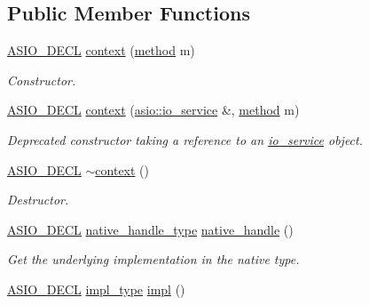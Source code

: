 \subsection*{Public Member Functions}
\begin{DoxyCompactItemize}
\item 
\hyperlink{config_8hpp_ab54d01ea04afeb9a8b39cfac467656b7}{A\+S\+I\+O\+\_\+\+D\+E\+C\+L} \hyperlink{classasio_1_1ssl_1_1context_ab6c186034550fa1b4991832cc7e5dc2b}{context} (\hyperlink{classasio_1_1ssl_1_1context__base_ac37d498266e3b13607f011ace6417525}{method} m)
\begin{DoxyCompactList}\small\item\em Constructor. \end{DoxyCompactList}\item 
\hyperlink{config_8hpp_ab54d01ea04afeb9a8b39cfac467656b7}{A\+S\+I\+O\+\_\+\+D\+E\+C\+L} \hyperlink{classasio_1_1ssl_1_1context_a0ca5760e47214ff3be8ceb41dbc420a1}{context} (\hyperlink{classasio_1_1io__service}{asio\+::io\+\_\+service} \&, \hyperlink{classasio_1_1ssl_1_1context__base_ac37d498266e3b13607f011ace6417525}{method} m)
\begin{DoxyCompactList}\small\item\em Deprecated constructor taking a reference to an \hyperlink{classasio_1_1io__service}{io\+\_\+service} object. \end{DoxyCompactList}\item 
\hyperlink{config_8hpp_ab54d01ea04afeb9a8b39cfac467656b7}{A\+S\+I\+O\+\_\+\+D\+E\+C\+L} \hyperlink{classasio_1_1ssl_1_1context_aa28787ca1050d36fdd98295c8453d554}{$\sim$context} ()
\begin{DoxyCompactList}\small\item\em Destructor. \end{DoxyCompactList}\item 
\hyperlink{config_8hpp_ab54d01ea04afeb9a8b39cfac467656b7}{A\+S\+I\+O\+\_\+\+D\+E\+C\+L} \hyperlink{classasio_1_1ssl_1_1context_a9f209f7e8420cbc694612e47eff53cc1}{native\+\_\+handle\+\_\+type} \hyperlink{classasio_1_1ssl_1_1context_aa2f7e5cec6bbd269dc9fa19ca3c11cf3}{native\+\_\+handle} ()
\begin{DoxyCompactList}\small\item\em Get the underlying implementation in the native type. \end{DoxyCompactList}\item 
\hyperlink{config_8hpp_ab54d01ea04afeb9a8b39cfac467656b7}{A\+S\+I\+O\+\_\+\+D\+E\+C\+L} \hyperlink{classasio_1_1ssl_1_1context_a5d497f2bb2fc277da12dc07c6ceea6fd}{impl\+\_\+type} \hyperlink{classasio_1_1ssl_1_1context_a7ee8e2221e7c19c6e4d6cb6d0b675fdb}{impl} ()

\end{DoxyCompactItemize}
